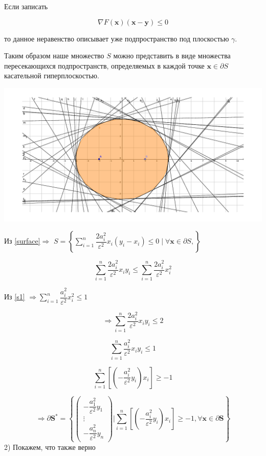 \documentclass[a4paper,12pt]{article}
\newcommand{\lt}{\left}
\newcommand{\rt}{\right}
\begin{document}
	Если записать 
	
	\begin{equation}\label{surface}	
	\nabla F (\mathbf{x}) \lt( \mathbf{x} - \mathbf{y} \rt) \le 0
	\end{equation}
	
	то данное неравенство описывает уже подпространство под плоскостью $\gamma$. 
	 
	Таким образом наше множество $S$ можно представить в виде множества пересекающихся подпространств, определяемых в каждой точке $\mathbf{x} \in \partial S $ касательной гиперплоскостью.
	
	\includegraphics[width=\textwidth]{image_problem4.pdf}
	
	Из \eqref{surface}$\Rightarrow$ $S = \lt\{ \sum\limits_{i=1}^{n}\dfrac{2a_i^2}{\varepsilon^2} x_i (y_i - x_i) \le 0 \mid \forall \mathbf{x} \in \partial S , \rt\}$
	
	$$\sum\limits_{i=1}^{n}\dfrac{2a_i^2}{\varepsilon^2} x_iy_i \le \sum\limits_{i=1}^{n}\dfrac{2a_i^2}{\varepsilon^2}x_i^2$$
	
	Из \eqref{s1} $\Rightarrow \sum\limits_{i=1}^{n}\dfrac{a_i^2}{\varepsilon^2}x_i^2\le 1$
	
	
	$$\Rightarrow  \sum\limits_{i=1}^{n}\dfrac{2a_i^2}{\varepsilon^2} x_iy_i \le 2$$
	
	$$\sum\limits_{i=1}^{n}\dfrac{a_i^2}{\varepsilon^2} x_iy_i \le 1$$
	
	$$\sum\limits_{i=1}^{n}\lt[\lt(-\dfrac{a_i^2}{\varepsilon^2} y_i\rt)x_i\rt] \ge -1$$	
		
	\begin{equation}
	\Rightarrow \label{s3}
	\partial \mathbf{S}^* = \lt\{ \begin{pmatrix}
	-\dfrac{a_1^2}{\varepsilon^2} y_1\\
	\vdots\\
	-\dfrac{a_n^2}{\varepsilon^2} y_n
	\end{pmatrix}
	\Big| \sum\limits_{i=1}^{n}\lt[\lt(-\dfrac{a_i^2}{\varepsilon^2} y_i\rt)x_i\rt] \ge -1, \forall \mathbf{x} \in \partial \mathbf{S} \rt\}
	\end{equation}
	2) Покажем, что также верно 
	
\end{document}
